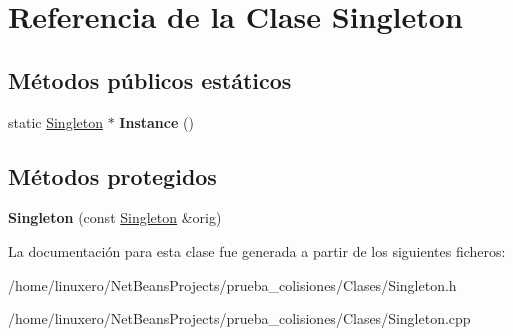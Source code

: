 \hypertarget{classSingleton}{\section{Referencia de la Clase Singleton}
\label{classSingleton}
}
\subsection*{Métodos públicos estáticos}
\begin{DoxyCompactItemize}
\item 
\hypertarget{classSingleton_a01073bb7481d82d783309be8ba3f51ba}{static \hyperlink{classSingleton}{Singleton} $\ast$ {\bfseries Instance} ()}\label{classSingleton_a01073bb7481d82d783309be8ba3f51ba}

\end{DoxyCompactItemize}
\subsection*{Métodos protegidos}
\begin{DoxyCompactItemize}
\item 
\hypertarget{classSingleton_a52a8e77a0efb8fc0a4650dbea397c676}{{\bfseries Singleton} (const \hyperlink{classSingleton}{Singleton} \&orig)}\label{classSingleton_a52a8e77a0efb8fc0a4650dbea397c676}

\end{DoxyCompactItemize}


La documentación para esta clase fue generada a partir de los siguientes ficheros\-:\begin{DoxyCompactItemize}
\item 
/home/linuxero/\-Net\-Beans\-Projects/prueba\-\_\-colisiones/\-Clases/Singleton.\-h\item 
/home/linuxero/\-Net\-Beans\-Projects/prueba\-\_\-colisiones/\-Clases/Singleton.\-cpp\end{DoxyCompactItemize}
